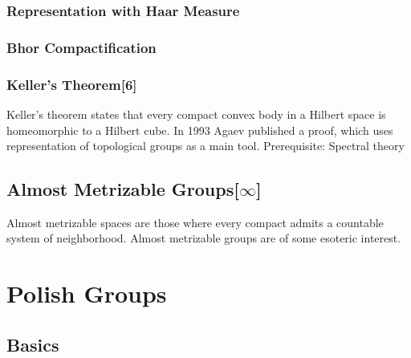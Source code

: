 \documentclass[12pt]{scrartcl}
\renewcommand{\.}{\; . \;}
\begin{document}
\subsubsection{Representation with Haar Measure}
\subsubsection{Bhor Compactification}
\subsubsection{Keller's Theorem[6]}
Keller's theorem states that every compact convex body 
in a Hilbert space is homeomorphic to a Hilbert cube.
In 1993 Agaev published a proof, which uses representation of topological groups as a main tool. Prerequisite: Spectral theory
\subsection{Almost Metrizable Groups[$\infty$]}
Almost metrizable spaces are those where every compact admits a countable system of neighborhood. Almost metrizable groups are of some esoteric interest. 
\newpage
\section{Polish Groups}
\subsection{Basics}
\end{document}
